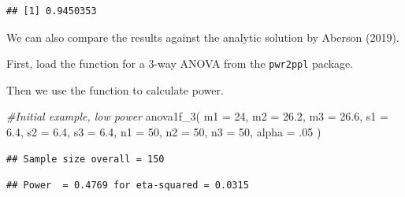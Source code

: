 \documentclass[
]{book}
\newenvironment{Shaded}{\begin{snugshade}}{\end{snugshade}}
\newcommand{\AttributeTok}[1]{\textcolor[rgb]{0.77,0.63,0.00}{#1}}
\newcommand{\CommentTok}[1]{\textcolor[rgb]{0.56,0.35,0.01}{\textit{#1}}}
\newcommand{\DecValTok}[1]{\textcolor[rgb]{0.00,0.00,0.81}{#1}}
\newcommand{\FloatTok}[1]{\textcolor[rgb]{0.00,0.00,0.81}{#1}}
\newcommand{\FunctionTok}[1]{\textcolor[rgb]{0.00,0.00,0.00}{#1}}
\newcommand{\NormalTok}[1]{#1}
\newcommand{\SpecialCharTok}[1]{\textcolor[rgb]{0.00,0.00,0.00}{#1}}
\begin{document}
\begin{verbatim}
## [1] 0.9450353
\end{verbatim}

We can also compare the results against the analytic solution by Aberson (2019).

First, load the function for a 3-way ANOVA from the \texttt{pwr2ppl} package.

Then we use the function to calculate power.

\begin{Shaded}
\begin{Highlighting}[]
\CommentTok{\#Initial example, low power}
\FunctionTok{anova1f\_3}\NormalTok{(}
\AttributeTok{m1 =} \DecValTok{24}\NormalTok{,}
\AttributeTok{m2 =} \FloatTok{26.2}\NormalTok{,}
\AttributeTok{m3 =} \FloatTok{26.6}\NormalTok{,}
\AttributeTok{s1 =} \FloatTok{6.4}\NormalTok{,}
\AttributeTok{s2 =} \FloatTok{6.4}\NormalTok{,}
\AttributeTok{s3 =} \FloatTok{6.4}\NormalTok{,}
\AttributeTok{n1 =} \DecValTok{50}\NormalTok{,}
\AttributeTok{n2 =} \DecValTok{50}\NormalTok{,}
\AttributeTok{n3 =} \DecValTok{50}\NormalTok{,}
\AttributeTok{alpha =}\NormalTok{ .}\DecValTok{05}
\NormalTok{)}
\end{Highlighting}
\end{Shaded}

\begin{verbatim}
## Sample size overall = 150
\end{verbatim}

\begin{verbatim}
## Power  = 0.4769 for eta-squared = 0.0315
\end{verbatim}

\begin{Shaded}
\end{Shaded}
\end{document}
